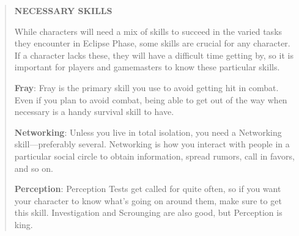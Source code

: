 \begin{quotation}
\textbf{NECESSARY SKILLS}

While characters will need a mix of skills to
succeed in the varied tasks they encounter in
Eclipse Phase, some skills are crucial for any
character. If a character lacks these, they will
have a difficult time getting by, so it is important
for players and gamemasters to know
these particular skills.

\textbf{Fray}: Fray is the primary skill you use to avoid
getting hit in combat. Even if you plan to avoid
combat, being able to get out of the way when
necessary is a handy survival skill to have.

\textbf{Networking}: Unless you live in total isolation,
you need a Networking skill—preferably several.
Networking is how you interact with people in
a particular social circle to obtain information,
spread rumors, call in favors, and so on.

\textbf{Perception}: Perception Tests get called for
quite often, so if you want your character to
know what’s going on around them, make sure
to get this skill. Investigation and Scrounging
are also good, but Perception is king.
\end{quotation}


